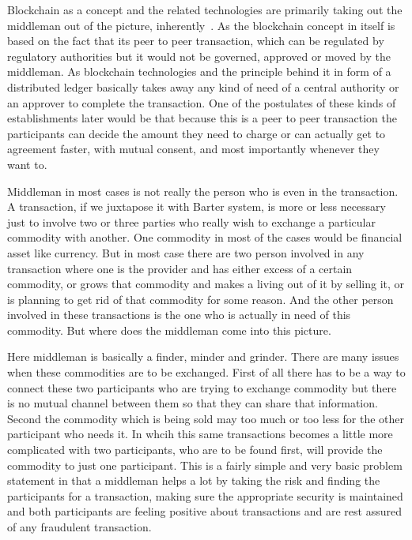 Blockchain as a concept and the related technologies are primarily
taking out the middleman out of the picture, inherently~\cite{lloyd4}.
As the blockchain concept in itself is based on the fact that its peer
to peer transaction, which can be regulated by regulatory authorities
but it would not be governed, approved or moved by the middleman. As
blockchain technologies and the principle behind it in form of a
distributed ledger basically takes away any kind of need of a central
authority or an approver to complete the transaction. One of the
postulates of these kinds of establishments later would be that
because this is a peer to peer transaction the participants can decide
the amount they need to charge or can actually get to agreement
faster, with mutual consent, and most importantly whenever they want
to.

Middleman in most cases is not really the person who is even in the
transaction. A transaction, if we juxtapose it with Barter system, is
more or less necessary just to involve two or three parties who really
wish to exchange a particular commodity with another. One commodity in
most of the cases would be financial asset like currency. But in most
case there are two person involved in any transaction where one is the
provider and has either excess of a certain commodity, or grows that
commodity and makes a living out of it by selling it, or is planning
to get rid of that commodity for some reason. And the other person
involved in these transactions is the one who is actually in need of
this commodity. But where does the middleman come into this picture.

Here middleman is basically a finder, minder and grinder. There are
many issues when these commodities are to be exchanged. First of all
there has to be a way to connect these two participants who are trying
to exchange commodity but there is no mutual channel between them so
that they can share that information. Second the commodity which is
being sold may too much or too less for the other participant who
needs it. In whcih this same transactions becomes a little more
complicated with two participants, who are to be found first, will
provide the commodity to just one participant. This is a fairly simple
and very basic problem statement in that a middleman helps a lot by
taking the risk and finding the participants for a transaction, making
sure the appropriate security is maintained and both participants are
feeling positive about transactions and are rest assured of any
fraudulent transaction.

